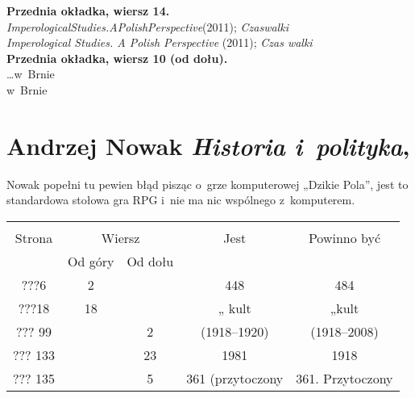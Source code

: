 \documentclass[a4paper,11pt]{article}
\numberwithin{equation}{section}
\begin{document}
\VerSpaceTwo


\noindent
\textbf{Przednia okładka, wiersz 14.} \\
\Jest \textit{ImperologicalStudies.APolishPerspective}(2011);
\textit{Czaswalki} \\
\PowinnoByc \textit{Imperological Studies. A Polish Perspective} (2011);
\textit{Czas walki} \\
\textbf{Przednia okładka, wiersz 10 (od dołu).} \\
\Jest \ldots w~Brnie \\
\PowinnoByc w~Brnie \\













\section{Andrzej Nowak \textit{Historia i~polityka},
  \parencite{Nowak-Od-Polski-do-Postpolityki-Pub-2011}}




\Str{} Nowak popełni tu pewien błąd pisząc o~grze komputerowej
„Dzikie Pola”, jest to standardowa stołowa gra RPG i~nie ma nic
wspólnego z~komputerem.







\begin{center}

  \begin{tabular}{|c|c|c|c|c|}
    \hline
    & \multicolumn{2}{c|}{} & & \\
    Strona & \multicolumn{2}{c|}{Wiersz} & Jest
                              & Powinno być \\ \cline{2-3}
    & Od góry & Od dołu & & \\
    \hline
    ???6   &  2 & & 448 & 484 \\
    ???18  & 18 & & „ kult & „kult \\
???    99  & &  2 & (1918--1920) & (1918--2008) \\
   ??? 133 & & 23 & 1981 & 1918 \\
???    135 & &  5 & 361 (przytoczony & 361. Przytoczony \\
    \hline
  \end{tabular}

\end{center}
\end{document}
